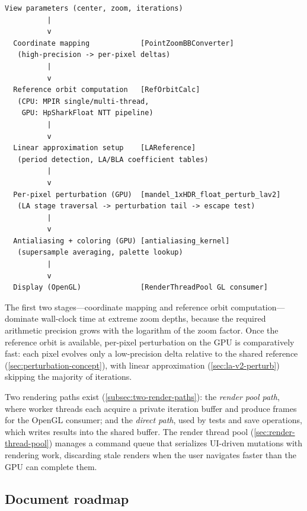 \begin{lstlisting}[language={},basicstyle=\ttfamily\small,columns=flexible]
  View parameters (center, zoom, iterations)
          |
          v
  Coordinate mapping            [PointZoomBBConverter]
   (high-precision -> per-pixel deltas)
          |
          v
  Reference orbit computation   [RefOrbitCalc]
   (CPU: MPIR single/multi-thread,
    GPU: HpSharkFloat NTT pipeline)
          |
          v
  Linear approximation setup    [LAReference]
   (period detection, LA/BLA coefficient tables)
          |
          v
  Per-pixel perturbation (GPU)  [mandel_1xHDR_float_perturb_lav2]
   (LA stage traversal -> perturbation tail -> escape test)
          |
          v
  Antialiasing + coloring (GPU) [antialiasing_kernel]
   (supersample averaging, palette lookup)
          |
          v
  Display (OpenGL)              [RenderThreadPool GL consumer]
\end{lstlisting}

The first two stages---coordinate mapping and reference orbit
computation---dominate wall-clock time at extreme zoom depths, because
the required arithmetic precision grows with the logarithm of the zoom
factor.  Once the reference orbit is available, per-pixel perturbation
on the GPU is comparatively fast: each pixel evolves only a low-precision
delta relative to the shared reference
(\cref{sec:perturbation-concept}), with linear approximation
(\cref{sec:la-v2-perturb}) skipping the majority of iterations.

Two rendering paths exist (\cref{subsec:two-render-paths}): the
\emph{render pool path}, where worker threads each acquire a private
iteration buffer and produce frames for the OpenGL consumer; and the
\emph{direct path}, used by tests and save operations, which writes
results into the shared  buffer.  The render thread
pool (\cref{sec:render-thread-pool}) manages a command queue that
serializes UI-driven mutations with rendering work, discarding stale
renders when the user navigates faster than the GPU can complete them.

\subsection*{Document roadmap}

